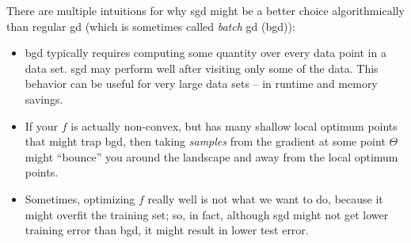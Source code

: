 There are multiple intuitions for why {\sc sgd} might be a better choice
algorithmically than regular {\sc gd} (which is sometimes called {\em
    batch} {\sc gd} ({\sc bgd})):
\begin{itemize}
  \item {\sc bgd} typically requires computing some quantity over every
        data point in a data set. {\sc sgd} may perform well after visiting only
        some of the data. This behavior can be useful for very large data sets --
        in runtime and memory savings.
  \item If your $f$ is actually non-convex, but has many shallow local
        optimum points that might trap {\sc bgd}, then taking {\em samples} from the
        gradient at some point $\Theta$ might ``bounce'' you around the
        landscape and away from the local optimum points.
  \item Sometimes, optimizing $f$ really well is not what we want to do,
        because it might overfit the training set;  so, in fact, although
          {\sc sgd} might not get lower training error than {\sc bgd}, it
        might result in lower test error.
\end{itemize}



